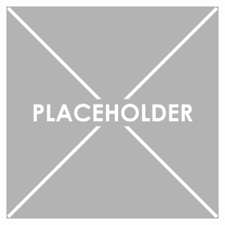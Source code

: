 \documentclass{article}
\begin{document}
\begin{figure}[ht]
    \begin{subfigure}{0.2\textwidth}
        \centering
        \begin{subfigure}{\textwidth}
            \centering
            \includegraphics[width=\linewidth]{placeholder.png}
        \end{subfigure}%


\end{subfigure}
\end{figure}
\end{document}
